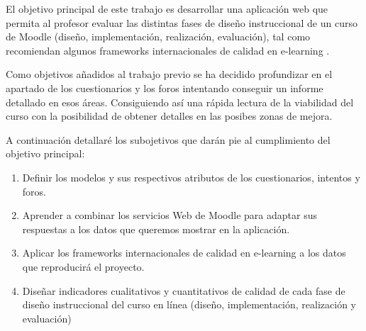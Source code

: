 
El objetivo principal de este trabajo es desarrollar una aplicación web que permita al profesor evaluar las distintas fases de diseño instruccional de un curso de Moodle (diseño, implementación, realización, evaluación), tal como recomiendan algunos frameworks internacionales de calidad en e-learning \cite{previotfg}.

Como objetivos añadidos al trabajo previo se ha decidido profundizar en el apartado de los cuestionarios y los foros intentando conseguir un informe detallado en esos áreas. Consiguiendo así una rápida lectura de la viabilidad del curso con la posibilidad de obtener detalles en las posibes zonas de mejora.

A continuación detallaré los subojetivos que darán pie al cumplimiento del objetivo principal:
\begin{enumerate}
    \item Definir los modelos y sus respectivos atributos de los cuestionarios, intentos y foros.
    \item Aprender a combinar los servicios Web de Moodle para adaptar sus respuestas a los datos que queremos mostrar en la aplicación.
    \item Aplicar los frameworks internacionales de calidad en e-learning a los datos que reproducirá el proyecto.
    \item Diseñar indicadores cualitativos y cuantitativos de calidad de cada fase de diseño instruccional del curso en línea (diseño, implementación, realización y evaluación)\cite{previotfg}
\end{enumerate}
